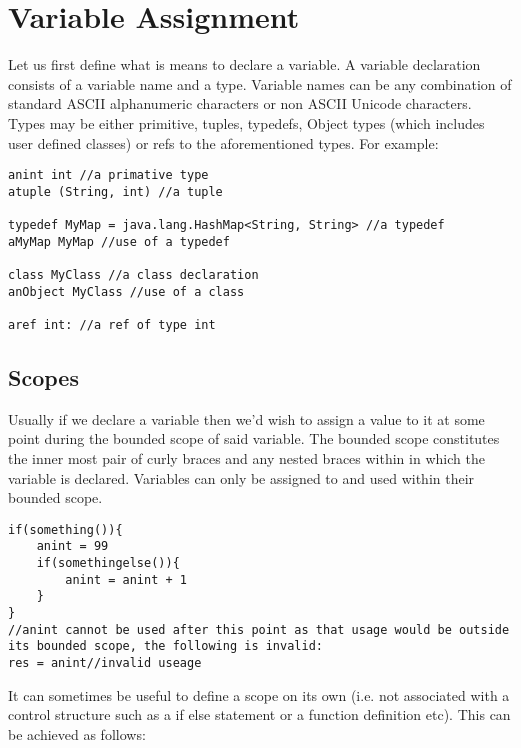 \documentclass[conc-doc]{subfiles}
\begin{document}
	\chapter[Variable Assignment]{Variable Assignment}
	\label{ch:assignment}
	
	
Let us first define what is means to declare a variable. A variable declaration consists of a variable name and a type. Variable names can be any combination of standard ASCII alphanumeric characters or non ASCII Unicode characters. Types may be either primitive, tuples, typedefs, Object types (which includes user defined classes) or refs to the aforementioned types. For example:
\begin{lstlisting}
anint int //a primative type
atuple (String, int) //a tuple

typedef MyMap = java.lang.HashMap<String, String> //a typedef
aMyMap MyMap //use of a typedef

class MyClass //a class declaration
anObject MyClass //use of a class

aref int: //a ref of type int
\end{lstlisting}

\section{Scopes}
Usually if we declare a variable then we'd wish to assign a value to it at some point during the bounded scope of said variable. The bounded scope constitutes the inner most pair of curly braces and any nested braces within in which the variable is declared. Variables can only be assigned to and used within their bounded scope.

\begin{lstlisting}
if(something()){
	anint = 99
	if(somethingelse()){
		anint = anint + 1
	}
}
//anint cannot be used after this point as that usage would be outside its bounded scope, the following is invalid:
res = anint//invalid useage
\end{lstlisting}

It can sometimes be useful to define a scope on its own (i.e. not associated with a control structure such as a if else statement or a function definition etc). This can be achieved as follows:
\end{document}
